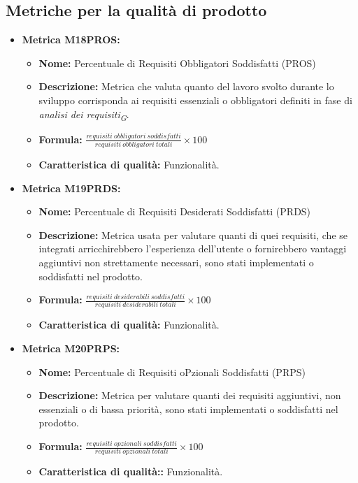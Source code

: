 \subsection{Metriche per la qualità di prodotto}
\begin{itemize}
    
    \item \textbf{Metrica M18PROS:}
    \begin{itemize}
     \item \textbf{Nome:} Percentuale di Requisiti Obbligatori Soddisfatti (PROS)
     \item \textbf{Descrizione:} Metrica che valuta quanto del lavoro svolto durante lo sviluppo corrisponda ai requisiti essenziali o obbligatori definiti in fase di \textit{analisi dei requisiti}\textsubscript{\textit{G}}.
     \item \textbf{Formula:} $\frac{requisiti \ obbligatori \ soddisfatti}{requisiti \ obbligatori \ totali}\times 100$
     \item \textbf{Caratteristica di qualità:} Funzionalità.
    \end{itemize}

    \item \textbf{Metrica M19PRDS:}
    \begin{itemize}
     \item \textbf{Nome:} Percentuale di Requisiti Desiderati Soddisfatti (PRDS)
     \item \textbf{Descrizione:} Metrica usata per valutare quanti di quei requisiti, che se integrati arricchirebbero l'esperienza dell'utente o fornirebbero vantaggi aggiuntivi non strettamente necessari, sono stati implementati o soddisfatti nel prodotto.
     \item \textbf{Formula:} $\frac{requisiti \ desiderabili \ soddisfatti}{requisiti \ desiderabili \ totali}\times 100$
     \item \textbf{Caratteristica di qualità:} Funzionalità.
    \end{itemize}

    \item \textbf{Metrica M20PRPS:}
    \begin{itemize}
     \item \textbf{Nome:} Percentuale di Requisiti oPzionali Soddisfatti (PRPS)
     \item \textbf{Descrizione:} Metrica per valutare quanti dei requisiti aggiuntivi, non essenziali o di bassa priorità, sono stati implementati o soddisfatti nel prodotto.
     \item \textbf{Formula:} $\frac{requisiti \ opzionali \ soddisfatti}{requisiti \ opzionali \ totali}\times 100$
     \item \textbf{Caratteristica di qualità::} Funzionalità.
    \end{itemize}


\end{itemize}
